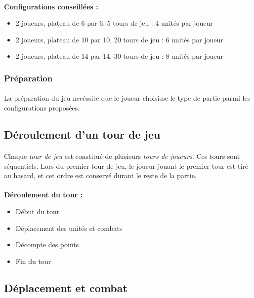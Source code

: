 \documentclass[a4paper]{article}
\begin{document}
\paragraph{}
\textbf{Configurations conseillées : }
\begin{itemize}
    \item 2 joueurs, plateau de 6 par 6, 5 tours de jeu : 4 unités par joueur
    \item 2 joueurs, plateau de 10 par 10, 20 tours de jeu : 6 unités par joueur
    \item 2 joueurs, plateau de 14 par 14, 30 tours de jeu : 8 unités par joueur
\end{itemize}

\subsubsection{Préparation}
\paragraph{}
La préparation du jeu necéssite que le joueur choisisse le type de partie parmi les configurations proposées. 

\subsection{Déroulement d'un tour de jeu}
\paragraph{}
Chaque \textit{tour de jeu} est constitué de plusieurs \textit{tours de joueurs}. Ces tours sont séquentiels. Lors du premier tour de jeu, le joueur jouant le premier tour est tiré au hasard, et cet ordre est conservé durant le reste de la partie.

\paragraph{}
\textbf{Déroulement du tour : }
\begin{itemize}
    \item Début du tour
    \item Déplacement des unités et combats
    \item Décompte des points
    \item Fin du tour
\end{itemize}

\subsection{Déplacement et combat}
\end{document}
